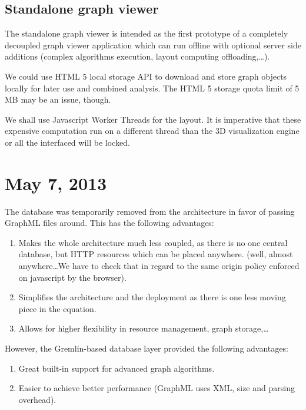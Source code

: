 \subsection{Standalone graph viewer}

The standalone graph viewer is intended as the first prototype of a completely decoupled graph viewer application which can run offline with optional server side additions (complex algorithms execution, layout computing offloading,\ldots).

We could use HTML 5 local storage API to download and store graph objects locally for later use and combined analysis. The HTML 5 storage quota limit of 5 MB may be an issue, though.

We shall use Javascript Worker Threads for the layout. It is imperative that these expensive computation run on a different thread than the 3D visualization engine or all the interfaced will be locked.

\section{May 7, 2013}

The database was temporarily removed from the architecture in favor of passing GraphML files around. This has the following advantages:

\begin{enumerate}
    \item Makes the whole architecture much less coupled, as there is no one central database, but HTTP resources which can be placed anywhere. (well, almost anywhere\ldots We have to check that in regard to the same origin policy enforced on javascript by the browser).
    \item Simplifies the architecture and the deployment as there is one less moving piece in the equation.
    \item Allows for higher flexibility in resource management, graph storage,\ldots
\end{enumerate}

However, the Gremlin-based database layer provided the following advantages:

\begin{enumerate}
    \item Great built-in support for advanced graph algorithms.
    \item Easier to achieve better performance (GraphML uses XML, \ie size and parsing overhead).
\end{enumerate}

